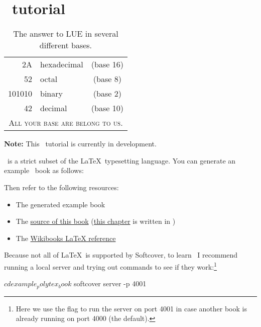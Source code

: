 \chapter{\PolyTeX\ tutorial} %
\label{cha:polytex_tutorial}

\begin{table}
\caption{The answer to LUE in several different bases.\label{table:answer}}
\begin{tabular}{|r|lc|}
  \hline
  2A & hexadecimal & (base 16) \\
  52 & octal & (base 8) \\
  101010 & binary & (base 2) \\
  \hline
  42 & decimal & (base 10) \\
  \hline
  \multicolumn{3}{|c|}{\textsc{All your base are belong to us.}} \\
  \hline
\end{tabular}
\end{table}

\noindent \textbf{Note:} This \PolyTeX\ tutorial is currently in development.

\PolyTeX\ is a strict subset of the \LaTeX\ typesetting language. You can generate an example \PolyTeX\ book as follows:


\noindent Then refer to the following resources:

\begin{itemize}
\item The generated example book
\item The \href{https://github.com/softcover/softcover_book}{source of this book} (\href{https://github.com/softcover/softcover_book/blob/master/chapters/polytex_tutorial.tex}{this chapter} is written in \PolyTeX)
\item The \href{http://en.wikibooks.org/wiki/LaTeX}{Wikibooks LaTeX reference}
\end{itemize}

Because not all of \LaTeX\ is supported by Softcover, to learn \PolyTeX\ I recommend running a local server and trying out commands to see if they work:\footnote{Here we use the  flag to run the server on port 4001 in case another book is already running on port 4000 (the default).}

\begin{code}
$ cd example_polytex_book
$ softcover server -p 4001
\end{code}

